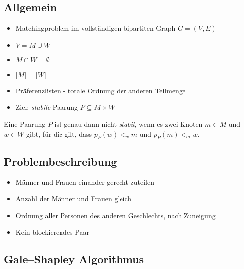 \subsection{Allgemein}
\begin{frame}
  \begin{itemize}[<+->]
  	\item Matchingproblem im vollständigen bipartiten Graph $G = (V,E)$
    \item $V = M \cup W$
    \item $M \cap W = \emptyset$
    \item $|M| = |W|$
    \item Präferenzlisten - totale Ordnung der anderen Teilmenge
    \item Ziel: \textit{stabile} Paarung $P \subseteq M \times W$
  \end{itemize}
\end{frame}

\begin{frame}
  \begin{Definition}
  \label{stabil}
    Eine Paarung $P$ ist genau dann nicht \textit{stabil}, wenn es zwei Knoten $m \in M$ und $w \in W$ gibt, für die gilt, dass $p_{P}(w) <_{w} m$ und $p_{P}(m) <_{m} w$.
  \end{Definition}
\end{frame}

\subsection{Problembeschreibung}
\begin{frame}
  \begin{itemize}[<+->]
  	\item Männer und Frauen einander gerecht zuteilen
    \item Anzahl der Männer und Frauen gleich
    \item Ordnung aller Personen des anderen Geschlechts, nach Zuneigung
    \item Kein blockierendes Paar
  \end{itemize}
\end{frame}

\begin{frame}
  
\end{frame}

\subsection{Gale–Shapley Algorithmus}
\begin{frame}
  
\end{frame}

